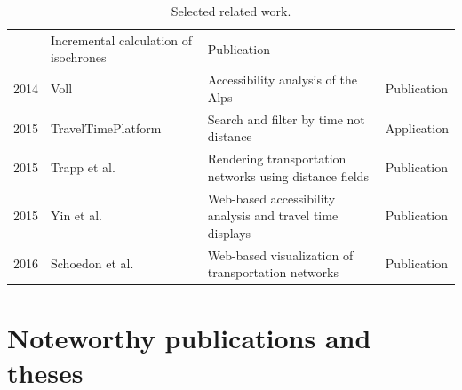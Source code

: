 \begin{table}[htp]
\begin{tabular}{r|l|l|l}
        & Incremental calculation of isochrones
        & Publication \\
      2014
        & Voll \cite{vollerreichbarkeiten}
        & Accessibility analysis of the Alps
        & Publication \\
      2015
        & TravelTimePlatform \cite{TravelTimePlatform}
        & Search and filter by time not distance
        & Application \\
      2015
        & Trapp et al. \cite{Trapp2015}
        & Rendering transportation networks using distance fields
        & Publication \\
      2015
        & Yin et al. \cite{Yin2015}
        & Web-based accessibility analysis and travel time displays
        & Publication \\
      2016
        & Schoedon et al. \cite{STHD2016}
        & Web-based visualization of transportation networks
        & Publication \\
    \end{tabular}
    \caption{Selected related work.}
    \label{tab:overv:relat}
  \end{table}

  \section{Noteworthy publications and theses}
    \label{sec:overv:publc}

